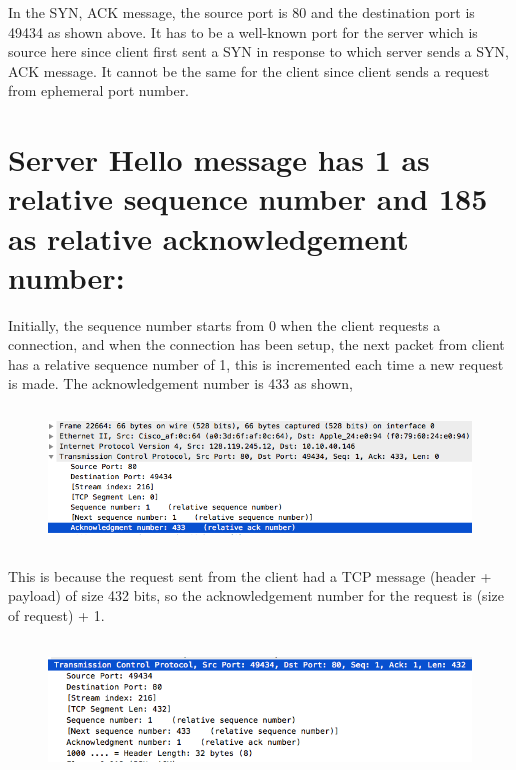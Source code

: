 \documentclass[]{report}
\begin{document}
In the SYN, ACK message, the source port is 80 and the destination port is 49434 as shown above. It has to be a well-known port for the server which is source here since client first sent a SYN in response to which server sends a SYN, ACK message. It cannot be the same for the client since client sends a request from ephemeral port number. 
\section{Server Hello message has 1 as relative sequence number and 185 as relative acknowledgement number:}
Initially, the sequence number starts from 0 when the client requests a connection, and when the connection has been setup, the next packet from client has a relative sequence number of 1, this is incremented each time a new request is made. The acknowledgement number is 433 as shown, 
\begin{figure}[H]
	\vspace{0pt}
	\includegraphics[height = 105pt, keepaspectratio]{Snapshots/q16_1.png}
\end{figure}
This is because the request sent from the client had a TCP message (header + payload) of size 432 bits, so the acknowledgement number for the request is (size of request) + 1.
\begin{figure}[H]
	\vspace{0pt}
	\includegraphics[height = 105pt, keepaspectratio]{Snapshots/q16_2.png}
\end{figure}
\end{document}
